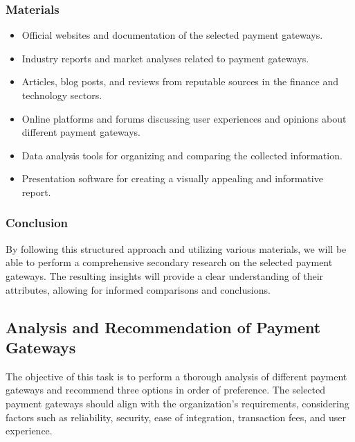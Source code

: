 \subsubsection{Materials}

\begin{itemize}
    \item Official websites and documentation of the selected payment gateways.
    \item Industry reports and market analyses related to payment gateways.
    \item Articles, blog posts, and reviews from reputable sources in the finance and technology sectors.
    \item Online platforms and forums discussing user experiences and opinions about different payment gateways.
    \item Data analysis tools for organizing and comparing the collected information.
    \item Presentation software for creating a visually appealing and informative report.
\end{itemize}

\subsubsection{Conclusion}

By following this structured approach and utilizing various materials, we will be able to perform a comprehensive secondary research on the selected payment gateways. The resulting insights will provide a clear understanding of their attributes, allowing for informed comparisons and conclusions.

\subsection{Analysis and Recommendation of Payment Gateways}
The objective of this task is to perform a thorough analysis of different payment gateways and recommend three options in order of preference. The selected payment gateways should align with the organization's requirements, considering factors such as reliability, security, ease of integration, transaction fees, and user experience.

